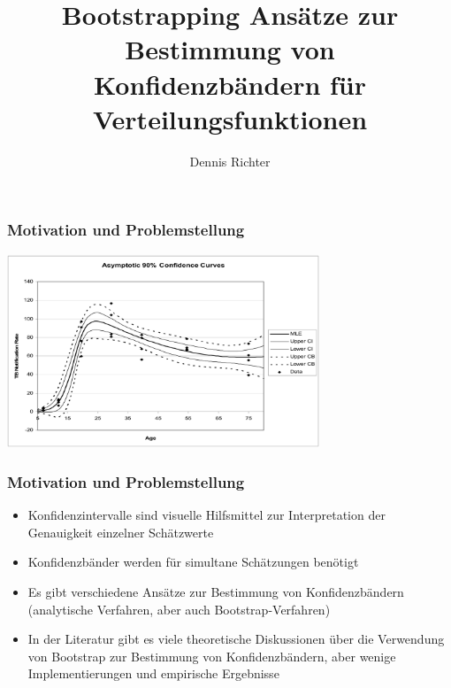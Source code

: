 \documentclass[aspectratio=1610, 9pt]{beamer}
\title{Bootstrapping Ansätze zur Bestimmung von Konfidenzbändern für Verteilungsfunktionen}
\author[D.~Richter]{Dennis Richter}
\institute[LS 4]{Lehrstuhl IV \\ Informatik}
\begin{document}
\maketitle

\begin{frame}
  \frametitle{Motivation und Problemstellung}
  \begin{center}
    \includegraphics[width=0.7\textwidth]{images/4.png}
  \end{center}
\end{frame}

\begin{frame}
  \frametitle{Motivation und Problemstellung}
  \begin{itemize}
    \item Konfidenzintervalle sind visuelle Hilfsmittel zur Interpretation der Genauigkeit einzelner Schätzwerte
    \item Konfidenzbänder werden für simultane Schätzungen benötigt
    \item Es gibt verschiedene Ansätze zur Bestimmung von Konfidenzbändern (analytische Verfahren, aber auch Bootstrap-Verfahren)
    \item In der Literatur gibt es viele theoretische Diskussionen über die Verwendung von Bootstrap zur Bestimmung von Konfidenzbändern, aber wenige Implementierungen und empirische Ergebnisse
  \end{itemize}
\end{frame}

\end{document}
